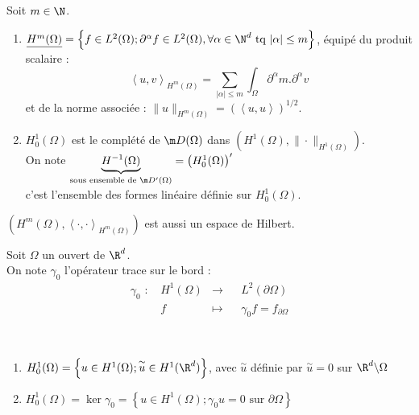 \documentclass[12pt,a4paper]{article}
\begin{document}
	\begin{defi}
		Soit $m \in \N$.\\
		\begin{enumerate}
			\item[$\star$] $\underline{H^m(\Omega)} = \left\{f \in L^2(\Omega); \partial^\alpha f\in L^2(\Omega), \forall\alpha\in \N^d \text{ tq } |\alpha| \leq m\right\}$, équipé du produit scalaire : 
			\[
			\left< u,v \right>_{H^m(\Omega)} = \displaystyle\sum_{|\alpha|\leq m} \int_\Omega \partial^\alpha m . \partial^\alpha v
			\]
			et de la norme associée : $\|u\|_{H^m(\Omega)} = \left(\left< u,u \right>\right)^{1/2}$.
			
			\item[$\star$] \underline{$H_0^1(\Omega)$} est le complété de $\m D(\Omega)$ dans $(H^1(\Omega),\|\cdot\|_{H^1(\Omega)})$.\\
			On note $\underbrace{H^{-1}(\Omega)}_{\text{sous ensemble de } \m D'(\Omega)} = \left(H_0^1(\Omega)\right)'$\\
			c'est l'ensemble des formes linéaire définie sur $H^1_0(\Omega)$.
		\end{enumerate}
	\end{defi}
	
	\begin{prop}
		$(H^m(\Omega),\left<\cdot,\cdot\right>_{H^m(\Omega)})$ est aussi un espace de Hilbert.
	\end{prop}
	
	\begin{defi}
		Soit $\Omega$ un ouvert de $\R^d$.\\
		On note $\gamma_0$ l'opérateur trace sur le bord :
		\[
		\begin{aligned}
			\gamma_0 \text{ : }& H^1(\Omega) & \rightarrow & & L^2(\partial \Omega)\\
			 & f & \mapsto & & \gamma_0 f = f_{\partial \Omega}
		\end{aligned}
		\]
	\end{defi}
	
	\begin{thm} $ $
		\begin{enumerate}
			\item[$\star$] \begin{minipage}[t]{15cm}
				$H^1_0(\Omega) = \left\{u\in H^1(\Omega); \overset{\sim}{u}\in H^1(\R^d)\right\}$, avec $\overset{\sim}{u}$ définie par $\overset{\sim}{u} = 0$ sur $\R^d\backslash\Omega$
			\end{minipage}
			
			\vspace{.5cm}
			
			\item[$\star$] $H^1_0(\Omega) = \ker \gamma_0 = \left\{u\in H^1(\Omega); \gamma_0 u = 0 \text{ sur } \partial\Omega\right\}$
		\end{enumerate}
	\end{thm}
	
\end{document}
